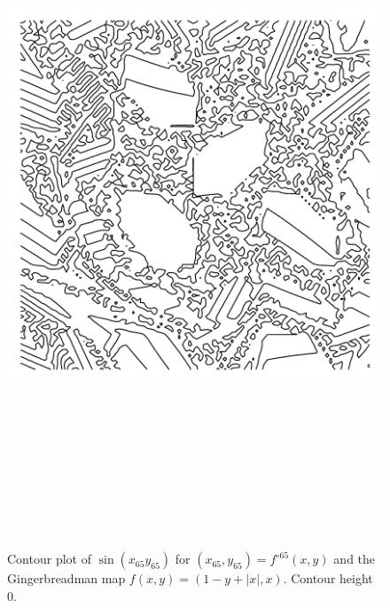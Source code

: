 \documentclass[12pt, a4paper]{amsart}
\begin{document}
\begin{figure}[!ht] 
\includegraphics[width=160mm, height=210mm]{gingerbreadman.pdf}
\caption{
Contour plot of $\sin(x_{65} y_{65})$ for $(x_{65}, y_{65}) = f^{\circ 65}(x, y)$ and the Gingerbreadman map $f(x, y) = (1 - y + |x|, x)$.
Contour height 0.
}
\end{figure}
\pagebreak
\end{document}
